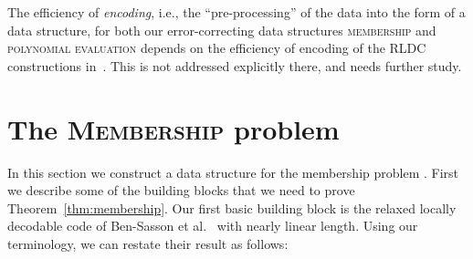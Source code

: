 \documentclass[11pt,english]{article}
\newcommand{\noun}[1]{\textsc{#1}}
\theoremstyle{definition}
\theoremstyle{remark}
\begin{document}
\iffalse
What about the efficiency of \emph{encoding}, i.e., the ``pre-processing'' of the data into the form of a data structure?
Our data structure for \noun{membership} is based on the noiseless one of Buhrman et al.~\cite{bmrv:bitvectorsj}, 
which uses a randomly constructed expander graph and a randomly chosen map from the set 
of all -element subsets of universe  to bit-strings of length .
The latter object takes roughly  bits to describe, which is exponentially larger than the size of the
data item that needs to be encoded. Ta-Shma~\cite{tashma:storing} gave a variant of their construction where 
the data structure is slightly longer, but efficiently constructible.
Together with a derandomization of Proposition~\ref{prop:balls vs bins} based on pairwise independence, 
we expect some variant of our data structure for \noun{membership} to be encodable in deterministic time .

Our data structure for \noun{polynomial evaluation} can be constructed deterministically in time . 
Note that this could be much worse than the length of the input polynomial , which is roughly  bits.
This contrasts with the work of Kedlaya and Umans~\cite{kedl-umans}, whose data structures can be constructed 
in time nearly linear in the length of the input.  In our construction we sacrificed this encoding-efficiency
in order to have the required error-correcting properties.
We leave the further optimization of these encodings to future work.
{\bf Check all this!!}
\fi



The efficiency of \emph{encoding}, i.e., the ``pre-processing'' of the data into the form of a data structure, for both our error-correcting data structures  \noun{membership} and \noun{polynomial evaluation} depends on the efficiency of encoding of the RLDC constructions in~\cite{bghsv04}.  This is not addressed explicitly there, and needs further study. 


\section{The \noun{Membership} problem\label{sec:Membership problem}}

In this section we construct a data structure for the membership problem
. First we describe some of the building blocks that
we need to prove Theorem~\ref{thm:membership}. Our first basic building
block is the relaxed locally decodable code of Ben-Sasson et al.~\cite{bghsv04}
with nearly linear length. Using our terminology, we can restate their
result as follows:
\end{document}
